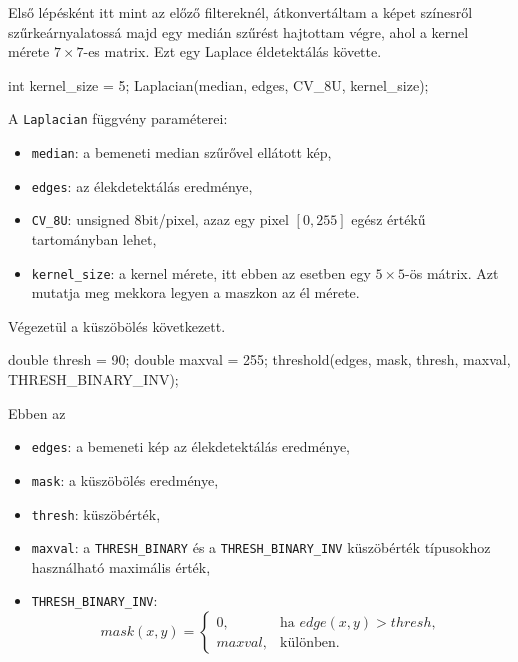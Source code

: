 Első lépésként itt mint az előző filtereknél, átkonvertáltam a képet színesről szűrkeárnyalatossá majd egy medián szűrést hajtottam végre, ahol a kernel mérete $7 \times 7$-es matrix.
Ezt egy Laplace éldetektálás követte.
\begin{cpp}
int kernel_size = 5;  
Laplacian(median, edges, CV_8U, kernel_size);
\end{cpp}
A \texttt{Laplacian} függvény paraméterei:
\begin{itemize}
    \item \texttt{median}: a bemeneti median szűrővel ellátott kép,
    \item \texttt{edges}: az élekdetektálás eredménye,
    \item \texttt{CV\_8U}: unsigned 8bit/pixel, azaz egy pixel $[0, 255]$ egész értékű tartományban lehet,
    \item \texttt{kernel\_size}: a kernel mérete, itt ebben az esetben egy $5 \times 5$-ös mátrix. Azt mutatja meg mekkora legyen a maszkon az él mérete.
\end{itemize}
Végezetül a küszöbölés következett.
\begin{cpp}
double thresh = 90;
double maxval = 255;
threshold(edges, mask, thresh, maxval, THRESH_BINARY_INV);
\end{cpp}
Ebben az
\begin{itemize}
    \item \texttt{edges}: a bemeneti kép az élekdetektálás eredménye,
    \item \texttt{mask}: a küszöbölés eredménye,
    \item \texttt{thresh}: küszöbérték,
    \item \texttt{maxval}: a \texttt{THRESH\_BINARY} és a \texttt{THRESH\_BINARY\_INV} küszöbérték típusokhoz használható maximális érték,
    \item \texttt{THRESH\_BINARY\_INV}:
$$
mask(x, y) =
\begin{cases}
0, & \mbox{ha } edge(x, y) > thresh, \\
maxval, & \mbox{különben}.
\end{cases}
$$
\end{itemize}


